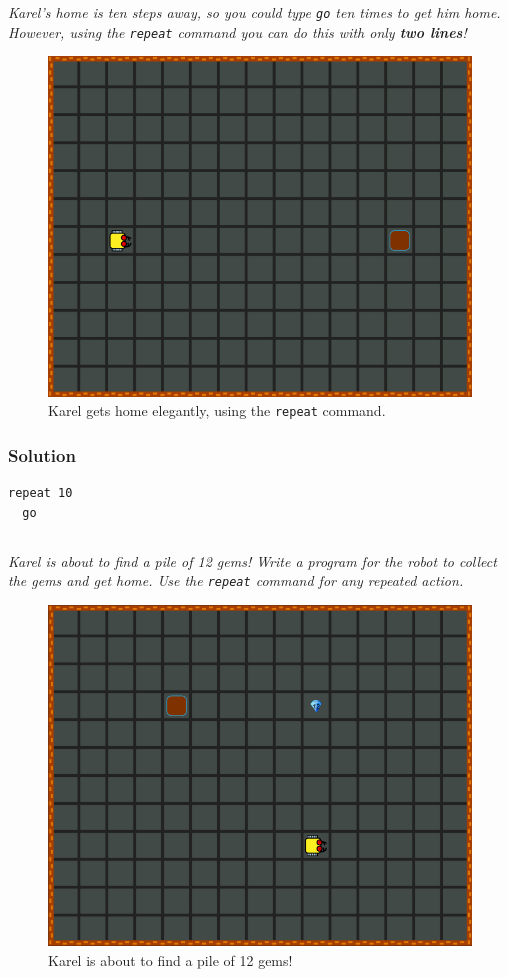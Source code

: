 \documentclass[article,A4,12pt]{llncs}
\begin{document}
{{{\em Karel's home is ten steps away, so you could type {\tt go} ten times to get him home. However, using the {\tt repeat} command you can do this with only {\bf two lines}! 

\begin{figure}[!ht]
\begin{center}
\includegraphics[height=0.4\textwidth]{imgk/c01.png}
\end{center}
\vspace{-4mm}
\caption{Karel gets home elegantly, using the {\tt repeat} command.}
\label{fig:c01}
\vspace{-4mm}
\end{figure}
\noindent

\subsubsection{Solution}
\begin{verbatim}
repeat 10
  go
\end{verbatim}

\newpage
\subsection{}

{\em Karel is about to find a pile of 12 gems! Write a program for the robot to collect the gems and get home. Use the {\tt repeat} command for any repeated action. 

\begin{figure}[!ht]
\begin{center}
\includegraphics[height=0.4\textwidth]{imgk/c02.png}
\end{center}
\vspace{-4mm}
\caption{Karel is about to find a pile of 12 gems!}
\label{fig:c02}
\vspace{-10mm}
\end{figure}
\noindent

}}}}
\end{document}

